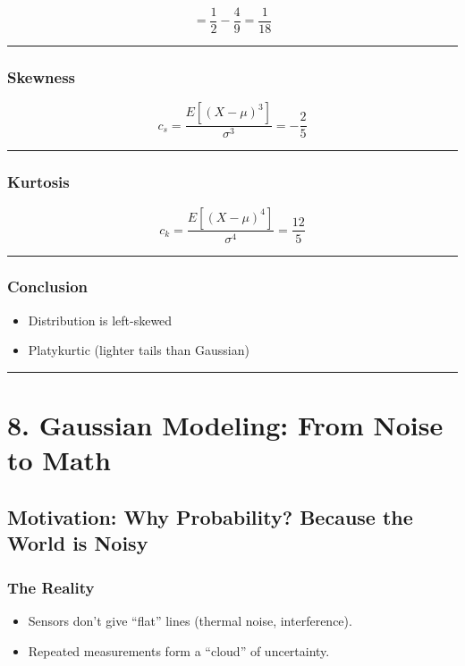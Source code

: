 \documentclass[12pt]{article}
\begin{document}
\[
=\frac{1}{2}-\frac{4}{9}=\frac{1}{18}
\]

\hrule
\vspace{1em}

\subsubsection*{\textbf{Skewness}}

\[
c_s=\frac{E[(X-\mu)^3]}{\sigma^3}=-\frac{2}{5}
\]

\hrule
\vspace{1em}

\subsubsection*{\textbf{Kurtosis}}

\[
c_k=\frac{E[(X-\mu)^4]}{\sigma^4}=\frac{12}{5}
\]

\hrule
\vspace{1em}

\subsubsection*{\textbf{Conclusion}}

\begin{itemize}
    \item Distribution is left-skewed
    \item Platykurtic (lighter tails than Gaussian)
\end{itemize}

\hrule
\vspace{1em}

\section*{\textbf{8. Gaussian Modeling: From Noise to Math}}

\subsection*{\textbf{Motivation: Why Probability? Because the World is Noisy}}

\subsubsection*{\textbf{The Reality}}

\begin{itemize}
    \item Sensors don’t give “flat” lines (thermal noise, interference).
    \item Repeated measurements form a “cloud” of uncertainty.
\end{itemize}
\end{document}
